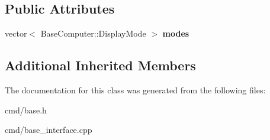 \subsection*{Public Attributes}
\begin{DoxyCompactItemize}
\item 
vector$<$ Base\+Computer\+::\+Display\+Mode $>$ {\bfseries modes}\hypertarget{classBaseInterface_1_1Room_1_1Comp_a4fee795dd3f5fe34ffec9e650170a800}{}\label{classBaseInterface_1_1Room_1_1Comp_a4fee795dd3f5fe34ffec9e650170a800}

\end{DoxyCompactItemize}
\subsection*{Additional Inherited Members}


The documentation for this class was generated from the following files\+:\begin{DoxyCompactItemize}
\item 
cmd/base.\+h\item 
cmd/base\+\_\+interface.\+cpp\end{DoxyCompactItemize}
